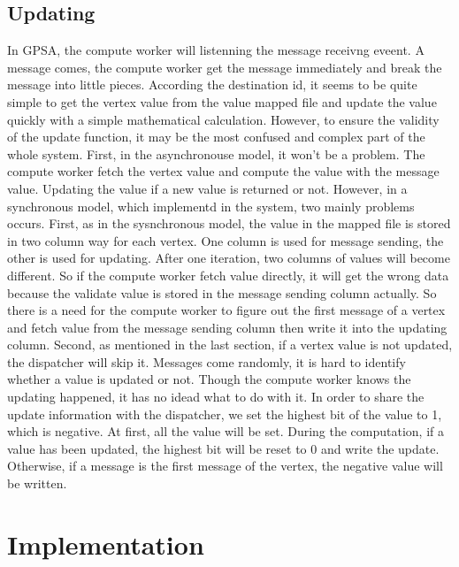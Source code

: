 \documentclass[twocolumn,a4paper,10pt]{article}
\begin{document}
\subsection{Updating}
In GPSA,  the compute worker will listenning the message receivng eveent. A message comes, the compute worker get the message immediately and break the message into little pieces. According the destination id, it seems to be quite simple to get the vertex value from the value mapped file  and update the value quickly with a simple mathematical calculation. However, to ensure the validity of the update function, it may be the most confused and complex part of the whole system. First, in the asynchronouse model, it won't be a problem. The compute worker fetch the vertex value and compute the value with the message value. Updating the value if a new value is returned or not. \newline
However, in a synchronous model, which implementd in the system, two mainly problems occurs. First, as in the sysnchronous model, the value in the mapped file is stored in two column way for each vertex. One column is used for message sending, the other is used for updating. After one iteration,  two columns of values will become different. So if the compute worker fetch value directly, it will get the wrong data because the validate value is stored in the message sending column actually. So there is a need for the compute worker to figure out the first message of a vertex and fetch value from the message sending column then write it into the updating column.  Second, as mentioned in the last section, if a vertex value is not updated, the dispatcher will skip it. Messages come randomly, it is hard to identify whether a value is updated or not. Though the compute worker knows the updating happened, it has no idead what to do with it. In order to share the update information with the dispatcher, we set the highest bit of the value to 1, which is negative. At first, all the value will be set. During the computation, if a value has been updated, the highest bit will be reset to 0 and write the update. Otherwise, if a message is the first message of the vertex, the negative value will be written.


\section{Implementation}
\end{document}
